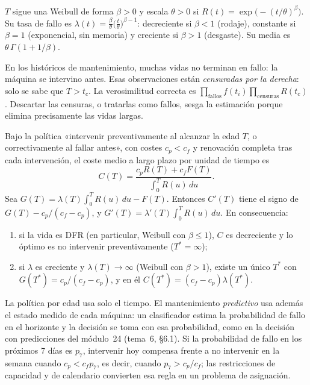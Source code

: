 \begin{definicion}\label{def:weibull}
$T$ sigue una Weibull de forma $\beta>0$ y escala $\theta>0$ si $R(t)=\exp\bigl(-(t/\theta)^{\beta}\bigr)$. Su tasa de fallo es $\lambda(t)=\frac{\beta}{\theta}\bigl(\frac{t}{\theta}\bigr)^{\beta-1}$: decreciente si $\beta<1$ (rodaje), constante si $\beta=1$ (exponencial, sin memoria) y creciente si $\beta>1$ (desgaste). Su media es $\theta\,\Gamma(1+1/\beta)$.
\end{definicion}

\begin{observacion}[Censura]\label{obs:censura}
En los históricos de mantenimiento, muchas vidas no terminan en fallo: la máquina se intervino antes. Esas observaciones están \emph{censuradas por la derecha}: solo se sabe que $T>t_c$. La verosimilitud correcta es $\prod_{\text{fallos}}f(t_i)\prod_{\text{censuras}}R(t_c)$. Descartar las censuras, o tratarlas como fallos, sesga la estimación porque elimina precisamente las vidas largas.
\end{observacion}

\begin{proposicion}\label{prop:edad}
Bajo la política «intervenir preventivamente al alcanzar la edad $T$, o correctivamente al fallar antes», con costes $c_p<c_f$ y renovación completa tras cada intervención, el coste medio a largo plazo por unidad de tiempo es
\[
C(T)=\frac{c_pR(T)+c_fF(T)}{\int_0^{T}R(u)\,du}.
\]
Sea $G(T)=\lambda(T)\int_0^TR(u)\,du-F(T)$. Entonces $C'(T)$ tiene el signo de $G(T)-c_p/(c_f-c_p)$, y $G'(T)=\lambda'(T)\int_0^TR(u)\,du$. En consecuencia:
\begin{enumerate}
  \item si la vida es DFR (en particular, Weibull con $\beta\le1$), $C$ es decreciente y lo óptimo es no intervenir preventivamente ($T^{*}=\infty$);
  \item si $\lambda$ es creciente y $\lambda(T)\to\infty$ (Weibull con $\beta>1$), existe un único $T^{*}$ con $G(T^{*})=c_p/(c_f-c_p)$, y en él $C(T^{*})=(c_f-c_p)\lambda(T^{*})$.
\end{enumerate}
\end{proposicion}

La política por edad usa solo el tiempo. El mantenimiento \emph{predictivo} usa además el estado medido de cada máquina: un clasificador estima la probabilidad de fallo en el horizonte y la decisión se toma con esa probabilidad, como en la decisión con predicciones del módulo~24 (tema~6, §6.1). Si la probabilidad de fallo en los próximos 7 días es $p_7$, intervenir hoy compensa frente a no intervenir en la semana cuando $c_p<c_fp_7$, es decir, cuando $p_7>c_p/c_f$; las restricciones de capacidad y de calendario convierten esa regla en un problema de asignación.

